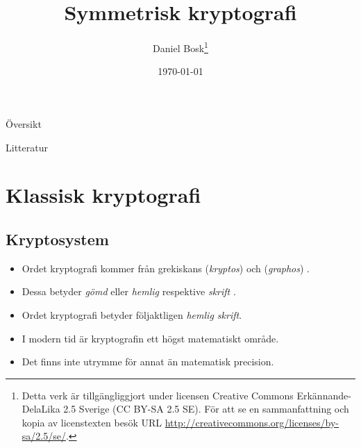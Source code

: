 \documentclass{beamer}
\title{%
  Symmetrisk kryptografi
}
\author{Daniel Bosk\footnote{%
  Detta verk är tillgängliggjort under licensen Creative Commons 
  Erkännande-DelaLika 2.5 Sverige (CC BY-SA 2.5 SE).
  För att se en sammanfattning och kopia av licenstexten besök URL 
  \url{http://creativecommons.org/licenses/by-sa/2.5/se/}.
}}
\institute[MIUN IKS]{%
  Avdelningen för informations- och kommunikationssytem (IKS),\\
  Mittuniversitetet, Sundsvall.
}
\date{\today}
\theoremstyle{definition}
\begin{document}
\begin{frame}
  \titlepage
\end{frame}

\begin{frame}{Översikt}
  \tableofcontents
\end{frame}
\begin{frame}{Litteratur}
  
\end{frame}





\section{Klassisk kryptografi}

\subsection{Kryptosystem}

\begin{frame}{\insertsubsectionhead}
  \begin{itemize}
    \item Ordet kryptografi kommer från grekiskans  
      (\emph{kryptos}) och  (\emph{graphos}) \cite{OED2013cg}.

    \item Dessa betyder \emph{gömd} eller \emph{hemlig} \cite{OED2013c} 
      respektive \emph{skrift} \cite{OED2013g}.

    \item Ordet kryptografi betyder följaktligen \emph{hemlig skrift}.

    \item I modern tid är kryptografin ett högst matematiskt område.

    \item Det finns inte utrymme för annat än matematisk precision.

  \end{itemize}
\end{frame}
\end{document}
